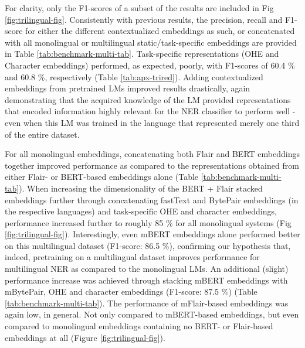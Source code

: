 \documentclass[12pt,a4paper,]{book}
\begin{document}
For clarity, only the F1-scores of a subset of the results are included in Fig \ref{fig:trilingual-fig}. Consistently with previous results, the precision, recall and F1-score for either the different contextualized embeddings as such, or concatenated with all monolingual or multilingual static/task-specific embeddings are provided in Table \ref{tab:benchmark-multi-tab}. Task-specific representations (OHE and Character embeddings) performed, as expected, poorly, with F1-scores of 60.4 \% and 60.8 \%, respectively (Table \ref{tab:apx-trired}). Adding contextualized embeddings from pretrained LMs improved results drastically, again demonstrating that the acquired knowledge of the LM provided representations that encoded information highly relevant for the NER classifier to perform well - even when this LM was trained in the language that represented merely one third of the entire dataset.

For all monolingual embeddings, concatenating both Flair and BERT embeddings together improved performance as compared to the representations obtained from either Flair- or BERT-based embeddings alone (Table \ref{tab:benchmark-multi-tab}). When increasing the dimensionality of the BERT + Flair stacked embeddings further through concatenating fastText and BytePair embeddings (in the respective languages) and task-specific OHE and character embeddings, performance increased further to roughly 85 \% for all monolingual systems (Fig \ref{fig:trilingual-fig}). Interestingly, even mBERT embeddings alone performed better on this multilingual dataset (F1-score: 86.5 \%), confirming our hypothesis that, indeed, pretraining on a multilingual dataset improves performance for multilingual NER as compared to the monolingual LMs. An additional (slight) performance increase was achieved through stacking mBERT embeddings with mBytePair, OHE and character embeddings (F1-score: 87.5 \%) (Table \ref{tab:benchmark-multi-tab}). The performance of mFlair-based embeddings was again low, in general. Not only compared to mBERT-based embeddings, but even compared to monolingual embeddings containing no BERT- or Flair-based embeddings at all (Figure \ref{fig:trilingual-fig}).
\end{document}
